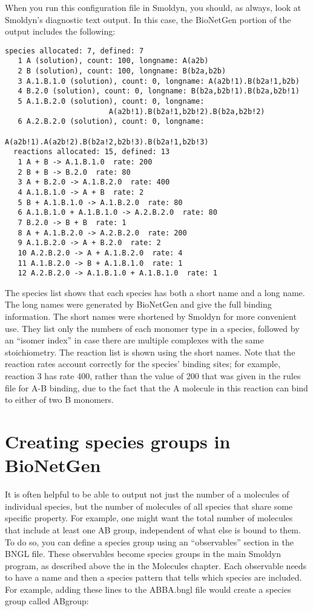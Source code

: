 \documentclass {scrbook}
\begin{document}
When you run this configuration file in Smoldyn, you should, as always, look at Smoldyn's diagnostic text output. In this case, the BioNetGen portion of the output includes the following:

\begin{lstlisting}[style=SSAC]
 species allocated: 7, defined: 7
   1 A (solution), count: 100, longname: A(a2b)
   2 B (solution), count: 100, longname: B(b2a,b2b)
   3 A.1.B.1.0 (solution), count: 0, longname: A(a2b!1).B(b2a!1,b2b)
   4 B.2.0 (solution), count: 0, longname: B(b2a,b2b!1).B(b2a,b2b!1)
   5 A.1.B.2.0 (solution), count: 0, longname:
						A(a2b!1).B(b2a!1,b2b!2).B(b2a,b2b!2)
   6 A.2.B.2.0 (solution), count: 0, longname:
						A(a2b!1).A(a2b!2).B(b2a!2,b2b!3).B(b2a!1,b2b!3)
  reactions allocated: 15, defined: 13
   1 A + B -> A.1.B.1.0  rate: 200
   2 B + B -> B.2.0  rate: 80
   3 A + B.2.0 -> A.1.B.2.0  rate: 400
   4 A.1.B.1.0 -> A + B  rate: 2
   5 B + A.1.B.1.0 -> A.1.B.2.0  rate: 80
   6 A.1.B.1.0 + A.1.B.1.0 -> A.2.B.2.0  rate: 80
   7 B.2.0 -> B + B  rate: 1
   8 A + A.1.B.2.0 -> A.2.B.2.0  rate: 200
   9 A.1.B.2.0 -> A + B.2.0  rate: 2
   10 A.2.B.2.0 -> A + A.1.B.2.0  rate: 4
   11 A.1.B.2.0 -> B + A.1.B.1.0  rate: 1
   12 A.2.B.2.0 -> A.1.B.1.0 + A.1.B.1.0  rate: 1
\end{lstlisting}

The species list shows that each species has both a short name and a long name. The long names were generated by BioNetGen and give the full binding information. The short names were shortened by Smoldyn for more convenient use. They list only the numbers of each monomer type in a species, followed by an ``isomer index'' in case there are multiple complexes with the same stoichiometry. The reaction list is shown using the short names. Note that the reaction rates account correctly for the species' binding sites; for example, reaction 3 has rate 400, rather than the value of 200 that was given in the rules file for A-B binding, due to the fact that the A molecule in this reaction can bind to either of two B monomers.

\section{Creating species groups in BioNetGen}

It is often helpful to be able to output not just the number of a molecules of individual species, but the number of molecules of all species that share some specific property. For example, one might want the total number of molecules that include at least one AB group, independent of what else is bound to them. To do so, you can define a species group using an ``observables'' section in the BNGL file. These observables become species groups in the main Smoldyn program, as described above the in the Molecules chapter. Each observable needs to have a name and then a species pattern that tells which species are included. For example, adding these lines to the ABBA.bngl file would create a species group called ABgroup:
\end{document}
